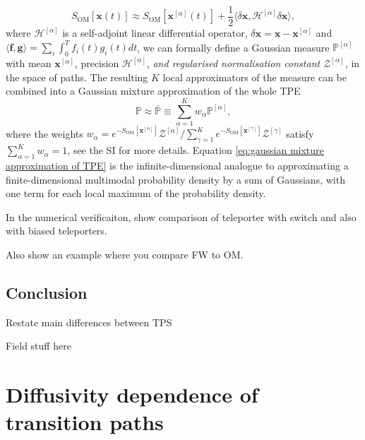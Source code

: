 {\begin{equation}
S_{\text{OM}}[\mathbf{x}(t)]\approx S_{\text{OM}}[\mathbf{x}^{[\alpha]}(t)]+\frac{1}{2}\langle\delta\mathbf{x},\mathcal{H}^{[\alpha]}\delta\mathbf{x\rangle},\label{eq:quadratic expansion}
\end{equation}
where $\mathcal{H}^{[\alpha]}$ is a self-adjoint linear differential
operator, $\delta\mathbf{\mathbf{x}}=\mathbf{x}-\mathbf{x}^{[\alpha]}$
and $\langle\mathbf{f},\mathbf{g}\rangle=\sum_{i}\int_{0}^{T}f_{i}(t)g_{i}(t)dt$,
we can formally define a Gaussian measure $\mathbb{P}^{[\alpha]}$
with mean $\mathbf{x}^{[\alpha]}$, precision $\mathcal{H}^{[\alpha]}$,
\textit{\emph{and regularised normalisation constant $\mathcal{Z}^{[\alpha]}$,
}}in the space of paths. The resulting $K$ local approximators of
the measure can be combined into a Gaussian mixture approximation
\textit{\emph{\citep{gelmanBayesianDataAnalysis}}} of the whole TPE
\begin{equation}
\mathbb{P}\approx\bar{\mathbb{P}}\equiv\sum_{\alpha=1}^{K}w_{\alpha}\mathbb{P}^{[\alpha]},\label{eq:gaussian mixture approximation of TPE}
\end{equation}
where the weights $w_{\alpha}=e^{-S_{\text{OM}}[\mathbf{x}^{[\alpha]}]}\mathcal{Z}^{[\alpha]}/\sum_{\gamma=1}^{K}e^{-S_{\text{OM}}[\mathbf{x}^{[\gamma]}]}\mathcal{Z}^{[\gamma]}$
satisfy $\sum_{\alpha=1}^{K}w_{\alpha}=1$, see the SI \citep{note:SI}
for more details. Equation \eqref{eq:gaussian mixture approximation of TPE}
is the infinite-dimensional analogue to approximating a finite-dimensional
multimodal probability density by a sum of Gaussians, with one term
for each local maximum of the probability density.

}


{
\color{blue}

In the numerical verificaiton, show comparison of teleporter with switch and also with biased teleporters.

Also show an example where you compare FW to OM.
}



\section{Conclusion}

Restate main differences between TPS

Field stuff here



\chapter{Diffusivity dependence of transition paths} \label{ch:Diffusivity dependence of transition paths}

